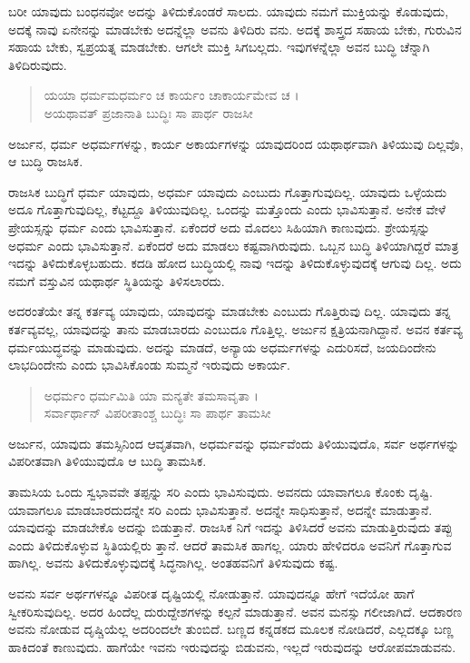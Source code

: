 ಬರೀ ಯಾವುದು ಬಂಧನವೋ ಅದನ್ನು ತಿಳಿದುಕೊಂಡರೆ ಸಾಲದು. ಯಾವುದು ನಮಗೆ ಮುಕ್ತಿಯನ್ನು ಕೊಡುವುದು, ಅದಕ್ಕೆ ನಾವು ಏನೇನನ್ನು ಮಾಡಬೇಕು ಅದನ್ನೆಲ್ಲಾ ಅವನು ತಿಳಿದಿರು ವನು. ಅದಕ್ಕೆ ಶಾಸ್ತ್ರದ ಸಹಾಯ ಬೇಕು, ಗುರುವಿನ ಸಹಾಯ ಬೇಕು, ಸ್ವಪ್ರಯತ್ನ ಮಾಡಬೇಕು. ಆಗಲೇ ಮುಕ್ತಿ ಸಿಗಬಲ್ಲದು. ಇವುಗಳನ್ನೆಲ್ಲಾ ಅವನ ಬುದ್ಧಿ ಚೆನ್ನಾಗಿ ತಿಳಿದಿರುವುದು.

\begin{verse}
ಯಯಾ ಧರ್ಮಮಧರ್ಮಂ ಚ ಕಾರ್ಯಂ ಚಾಕಾರ್ಯಮೇವ ಚ ।\\ಅಯಥಾವತ್ ಪ್ರಜಾನಾತಿ ಬುದ್ಧಿಃ ಸಾ ಪಾರ್ಥ ರಾಜಸೀ 
\end{verse}

{\small ಅರ್ಜುನ, ಧರ್ಮ ಅಧರ್ಮಗಳನ್ನು, ಕಾರ್ಯ ಅಕಾರ್ಯಗಳನ್ನು ಯಾವುದರಿಂದ ಯಥಾರ್ಥವಾಗಿ ತಿಳಿಯುವು ದಿಲ್ಲವೊ, ಆ ಬುದ್ಧಿ ರಾಜಸಿಕ.}

ರಾಜಸಿಕ ಬುದ್ಧಿಗೆ ಧರ್ಮ ಯಾವುದು, ಅಧರ್ಮ ಯಾವುದು ಎಂಬುದು ಗೊತ್ತಾಗುವುದಿಲ್ಲ. ಯಾವುದು ಒಳ್ಳೆಯದು ಅದೂ ಗೊತ್ತಾಗುವುದಿಲ್ಲ, ಕೆಟ್ಟದ್ದೂ ತಿಳಿಯುವುದಿಲ್ಲ. ಒಂದನ್ನು ಮತ್ತೊಂದು ಎಂದು ಭಾವಿಸುತ್ತಾನೆ. ಅನೇಕ ವೇಳೆ ಪ್ರೇಯಸ್ಸನ್ನು ಧರ್ಮ ಎಂದು ಭಾವಿಸುತ್ತಾನೆ. ಏಕೆಂದರೆ ಅದು ಮೊದಲು ಸಿಹಿಯಾಗಿ ಕಾಣುವುದು. ಶ್ರೇಯಸ್ಸನ್ನು ಅಧರ್ಮ ಎಂದು ಭಾವಿಸುತ್ತಾನೆ. ಏಕೆಂದರೆ ಅದು ಮಾಡಲು ಕಷ್ಟವಾಗಿರುವುದು. ಒಬ್ಬನ ಬುದ್ಧಿ ತಿಳಿಯಾಗಿದ್ದರೆ ಮಾತ್ರ ಇದನ್ನು ತಿಳಿದುಕೊಳ್ಳಬಹುದು. ಕದಡಿ ಹೋದ ಬುದ್ಧಿಯಲ್ಲಿ ನಾವು ಇದನ್ನು ತಿಳಿದುಕೊಳ್ಳುವುದಕ್ಕೆ ಆಗುವು ದಿಲ್ಲ. ಅದು ನಮಗೆ ವಸ್ತುವಿನ ಯಥಾರ್ಥ ಸ್ಥಿತಿಯನ್ನು ತಿಳಿಸಲಾರದು.

ಅದರಂತೆಯೇ ತನ್ನ ಕರ್ತವ್ಯ ಯಾವುದು, ಯಾವುದನ್ನು ಮಾಡಬೇಕು ಎಂಬುದು ಗೊತ್ತಿರುವು ದಿಲ್ಲ. ಯಾವುದು ತನ್ನ ಕರ್ತವ್ಯವಲ್ಲ, ಯಾವುದನ್ನು ತಾನು ಮಾಡಬಾರದು ಎಂಬುದೂ ಗೊತ್ತಿಲ್ಲ. ಅರ್ಜುನ ಕ್ಷತ್ರಿಯನಾಗಿದ್ದಾನೆ. ಅವನ ಕರ್ತವ್ಯ ಧರ್ಮಯುದ್ಧವನ್ನು ಮಾಡುವುದು. ಅದನ್ನು ಮಾಡದೆ, ಅನ್ಯಾಯ ಅಧರ್ಮಗಳನ್ನು ಎದುರಿಸದೆ, ಜಯದಿಂದೇನು ಲಾಭದಿಂದೇನು ಎಂದು ಭಾವಿಸಿಕೊಂಡು ಸುಮ್ಮನೆ ಇರುವುದು ಅಕಾರ್ಯ.

\begin{verse}
ಅಧರ್ಮಂ ಧರ್ಮಮಿತಿ ಯಾ ಮನ್ಯತೇ ತಮಸಾವೃತಾ ।\\ಸರ್ವಾರ್ಥಾನ್ ವಿಪರೀತಾಂಶ್ಚ ಬುದ್ಧಿಃ ಸಾ ಪಾರ್ಥ ತಾಮಸೀ 
\end{verse}

{\small ಅರ್ಜುನ, ಯಾವುದು ತಮಸ್ಸಿನಿಂದ ಆವೃತವಾಗಿ, ಅಧರ್ಮವನ್ನು ಧರ್ಮವೆಂದು ತಿಳಿಯುವುದೊ, ಸರ್ವ ಅರ್ಥಗಳನ್ನು ವಿಪರೀತವಾಗಿ ತಿಳಿಯುವುದೊ ಆ ಬುದ್ಧಿ ತಾಮಸಿಕ.}

ತಾಮಸಿಯ ಒಂದು ಸ್ವಭಾವವೇ ತಪ್ಪನ್ನು ಸರಿ ಎಂದು ಭಾವಿಸುವುದು. ಅವನದು ಯಾವಾಗಲೂ ಕೊಂಕು ದೃಷ್ಟಿ. ಯಾವಾಗಲೂ ಮಾಡಬಾರದುದನ್ನೇ ಸರಿ ಎಂದು ಭಾವಿಸುತ್ತಾನೆ. ಅದನ್ನೇ ಸಾಧಿಸುತ್ತಾನೆ, ಅದನ್ನೇ ಮಾಡುತ್ತಾನೆ. ಯಾವುದನ್ನು ಮಾಡಬೇಕೊ ಅದನ್ನು ಬಿಡುತ್ತಾನೆ. ರಾಜಸಿಕ ನಿಗೆ ಇದನ್ನು ತಿಳಿಸಿದರೆ ಅವನು ಮಾಡುತ್ತಿರುವುದು ತಪ್ಪು ಎಂದು ತಿಳಿದುಕೊಳ್ಳುವ ಸ್ಥಿತಿಯಲ್ಲಿರು ತ್ತಾನೆ. ಆದರೆ ತಾಮಸಿಕ ಹಾಗಲ್ಲ. ಯಾರು ಹೇಳಿದರೂ ಅವನಿಗೆ ಗೊತ್ತಾಗುವ ಹಾಗಿಲ್ಲ. ಅವನು ತಿಳಿದುಕೊಳ್ಳುವುದಕ್ಕೆ ಸಿದ್ಧನಾಗಿಲ್ಲ. ಅಂತಹವನಿಗೆ ತಿಳಿಸುವುದು ಕಷ್ಟ.

ಅವನು ಸರ್ವ ಅರ್ಥಗಳನ್ನೂ ವಿಪರೀತ ದೃಷ್ಟಿಯಲ್ಲಿ ನೋಡುತ್ತಾನೆ. ಯಾವುದನ್ನೂ ಹೇಗೆ ಇದೆಯೋ ಹಾಗೆ ಸ್ವೀಕರಿಸುವುದಿಲ್ಲ. ಅದರ ಹಿಂದೆಲ್ಲ ದುರುದ್ದೇಶಗಳನ್ನು ಕಲ್ಪನೆ ಮಾಡುತ್ತಾನೆ. ಅವನ ಮನಸ್ಸು ಗಲೀಜಾಗಿದೆ. ಆದಕಾರಣ ಅವನು ನೋಡುವ ದೃಷ್ಚಿಯೆಲ್ಲ ಅದರಿಂದಲೇ ತುಂಬಿದೆ. ಬಣ್ಣದ ಕನ್ನಡಕದ ಮೂಲಕ ನೋಡಿದರೆ, ಎಲ್ಲದಕ್ಕೂ ಬಣ್ಣ ಹಾಕಿದಂತೆ ಕಾಣುವುದು. ಹಾಗೆಯೇ ಇವನು ಇರುವುದನ್ನು ಬಿಡುವನು, ಇಲ್ಲದೆ ಇರುವುದನ್ನು ಆರೋಪಮಾಡುವನು.

